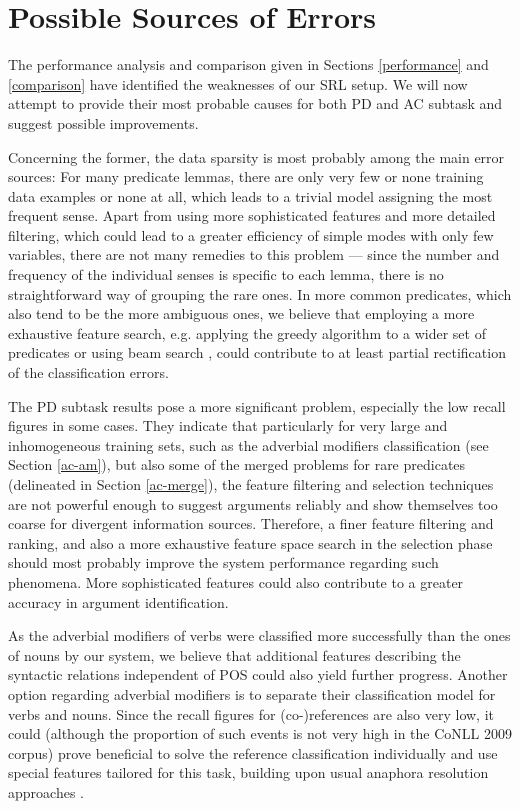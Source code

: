 \documentclass[12pt,notitlepage]{report}
\begin{document}
\section{Possible Sources of Errors}\label{error-sources}

The performance analysis and comparison given in Sections \ref{performance} and \ref{comparison} have identified the weaknesses of our SRL setup. We will now attempt to provide their most probable causes for both PD and AC subtask and suggest possible improvements.

Concerning the former, the data sparsity is most probably among the main error sources: For many predicate lemmas, there are only very few or none training data examples or none at all, which leads to a trivial model assigning the most frequent sense. Apart from using more sophisticated features and more detailed filtering, which could lead to a greater efficiency of simple modes with only few variables, there are not many remedies to this problem --- since the number and frequency of the individual senses is specific to each lemma, there is no straightforward way of grouping the rare ones. In more common predicates, which also tend to be the more ambiguous ones, we believe that employing a more exhaustive feature search, e.g. applying the greedy algorithm to a wider set of predicates or using beam search \citep{aha95}, could contribute to at least partial rectification of the classification errors.
 
The PD subtask results pose a more significant problem, especially the low recall figures in some cases. They indicate that particularly for very large and inhomogeneous training sets, such as the adverbial modifiers classification (see Section \ref{ac-am}), but also some of the merged problems for rare predicates (delineated in Section \ref{ac-merge}), the feature filtering and selection techniques are not powerful enough to suggest arguments reliably and show themselves too coarse for divergent information sources. Therefore, a finer feature filtering and ranking, and also a more exhaustive feature space search in the selection phase should most probably improve the system performance regarding such phenomena. More sophisticated features could also contribute to a greater accuracy in argument identification.

As the adverbial modifiers of verbs were classified more successfully than the ones of nouns by our system, we believe that additional features describing the syntactic relations independent of POS could also yield further progress. Another option regarding adverbial modifiers is to separate their classification model for verbs and nouns. Since the recall figures for (co-)references are also very low, it could (although the proportion of such events is not very high in the CoNLL 2009 corpus) prove beneficial to solve the reference classification individually and use special features tailored for this task, building upon usual anaphora resolution approaches \citep{soon01,ng02}.
\end{document}
